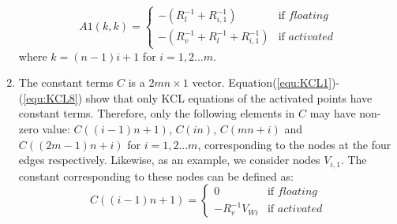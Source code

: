 \begin{enumerate}
    \begin{equation}
    A1(k,k) = \left\{
    \begin{array}{ll}
    -(R_l^{-1}+R_{i,1}^{-1})   & \text{if } floating\\
    -(R_v^{-1}+R_l^{-1}+R_{i,1}^{-1})& \text{if } activated
    \end{array} \right.
    \end{equation}
    where $k=(n-1)i+1$ for $i=1,2...m$.

\item The constant terms $C$ is a $2mn{\times}1$ vector.
    Equation(\ref{equ:KCL1})-(\ref{equ:KCL8}) show that only KCL
    equations of the activated points have constant terms. Therefore,
    only the following elements in $C$ may have non-zero value:
    $C((i-1)n+1)$, $C(in)$, $C(mn+i)$ and $C((2m-1)n+i)$ for
    $i=1,2...m$, corresponding to the nodes at the four edges
    respectively. Likewise, as an example, we consider nodes
    $V_{i,1}$. The constant corresponding to these nodes can be
    defined as:
    \begin{equation}
    C((i-1)n+1) = \left\{
    \begin{array}{ll}
    0   & \text{if } floating\\
    -R_v^{-1}V_{Wi}& \text{if } activated
    \end{array} \right.
    \end{equation}
\end{enumerate}
